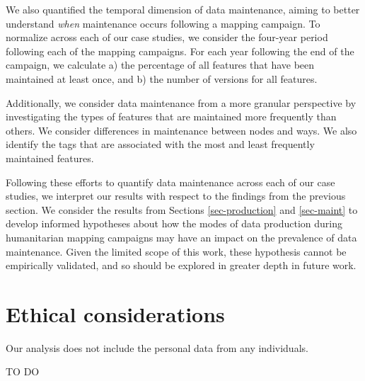 We also quantified the temporal dimension of data maintenance, aiming to better understand \textit{when} maintenance occurs following a mapping campaign. To normalize across each of our case studies, we consider the four-year period following each of the mapping campaigns. For each year following the end of the campaign, we calculate a) the percentage of all features that have been maintained at least once, and b) the number of versions for all features. 

Additionally, we consider data maintenance from a more granular perspective by investigating the types of features that are maintained more frequently than others. We consider differences in maintenance between nodes and ways. We also identify the tags that are associated with the most and least frequently maintained features. 

Following these efforts to quantify data maintenance across each of our case studies, we interpret our results with respect to the findings from the previous section. We consider the results from Sections \ref{sec-production} and \ref{sec-maint} to develop informed hypotheses about how the modes of data production during humanitarian mapping campaigns may have an impact on the prevalence of data maintenance. Given the limited scope of this work, these hypothesis cannot be empirically validated, and so should be explored in greater depth in future work. 

\section{Ethical considerations}

Our analysis does not include the personal data from any individuals. 

TO DO